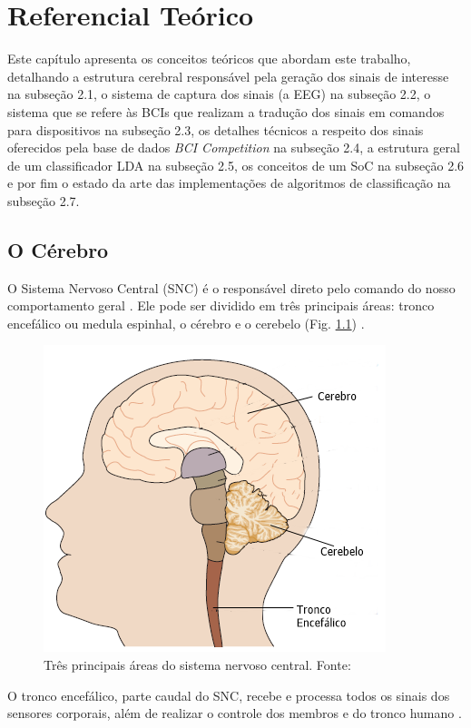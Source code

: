 
\chapter[Referencial Teórico]{Referencial Teórico}
Este capítulo apresenta os conceitos teóricos que abordam este trabalho, detalhando a estrutura cerebral responsável pela geração dos sinais de interesse na subseção 2.1, o sistema de captura dos sinais (a EEG) na subseção 2.2, o sistema que se refere às BCIs que realizam a tradução dos sinais em comandos para dispositivos na subseção 2.3, os detalhes técnicos a respeito dos sinais oferecidos pela base de dados \textit{BCI Competition} na subseção 2.4, a estrutura geral de um classificador LDA na subseção 2.5, os conceitos de um SoC na subseção 2.6 e por fim o estado da arte das implementações de algoritmos de classificação na subseção 2.7. 

\section{O Cérebro}
O Sistema Nervoso Central (SNC) é o responsável direto pelo comando do nosso comportamento geral \cite{David_Clarck}. Ele pode ser dividido em três principais áreas: tronco encefálico ou medula espinhal, o cérebro e o cerebelo (Fig. \ref{BrainParts}) \cite{alvarezneurobiomecanismos}.

\begin{figure}[h]
	\centering
	\includegraphics[keepaspectratio=true,scale=1.0]{figuras/estrutura_cerebral.PNG}
	\caption{Três principais áreas do sistema nervoso central. Fonte: \cite{KANDEL}}
	\label{BrainParts}
\end{figure}

O tronco encefálico, parte caudal do SNC, recebe e processa todos os sinais dos sensores corporais, além de realizar o controle dos membros e do tronco humano \cite{KANDEL}.


